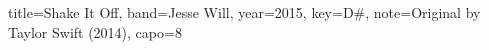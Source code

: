 \documentclass{skrul-leadsheet}
\begin{document}
\begin{song}[transpose-capo=true]{title={Shake It Off}, band={Jesse Will}, year={2015}, key={D#}, note={Original by Taylor Swift (2014)}, capo={8}}

\end{song}
\end{document}
